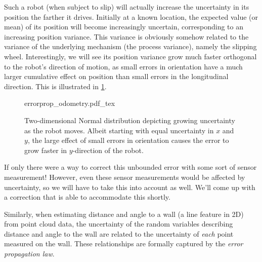 Such a robot (when subject to slip) will actually increase the uncertainty in its position the farther it drives. Initially at a known location, the expected value (or mean) of its position will become increasingly uncertain, corresponding to an increasing position variance. This variance is obviously somehow related to the variance of the underlying mechanism (the process variance), namely the slipping wheel. Interestingly, we will see its position variance grow much faster orthogonal to the robot's direction of motion, as small errors in orientation have a much larger cumulative effect on position than small errors in the longitudinal direction. This is illustrated in \cref{fig:errorprop_odometry}.

\begin{figure}
	\centering
    \def\svgwidth{\textwidth}
    {errorprop_odometry.pdf_tex}
	\caption{Two-dimensional Normal distribution depicting growing uncertainty as the robot moves. Albeit starting with equal
    uncertainty in $x$ and $y$, the large effect of small errors in orientation causes the error to grow faster in $y$-direction of the robot.}
	\label{fig:errorprop_odometry}
\end{figure}

If only there were a way to correct this unbounded error with some sort of sensor measurement! However, even these sensor measurements would be affected by uncertainty, so we will have to take this into account as well. We'll come up with a correction that is able to accommodate this shortly.

Similarly, when estimating distance and angle to a wall (a line feature in 2D) from point cloud data, the uncertainty of the random variables describing distance and angle to the wall are related to the uncertainty of \textsl{each} point measured on the wall. These relationships are formally captured by the \textsl{error propagation law}.

